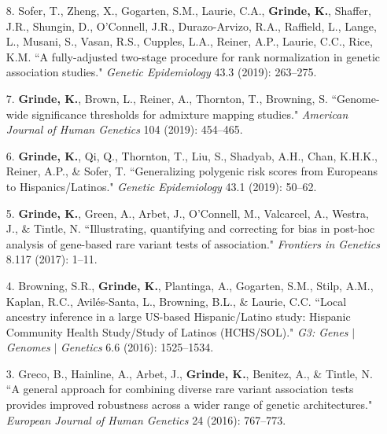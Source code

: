 \documentclass[margin]{res}
\begin{document}
\begin{resume}
\begin{itemize}
\item[8.] Sofer, T., Zheng, X., Gogarten, S.M., Laurie, C.A., \textbf{Grinde, K.}, Shaffer, J.R., Shungin, D., O'Connell, J.R., Durazo-Arvizo, R.A., Raffield, L., Lange, L., Musani, S., Vasan, R.S., Cupples, L.A., Reiner, A.P., Laurie, C.C., Rice, K.M. ``A fully-adjusted two-stage procedure for rank normalization in genetic association studies." \textit{Genetic Epidemiology} 43.3 (2019): 263--275.

\item[7.] \textbf{Grinde, K.}, Brown, L., Reiner, A., Thornton, T., Browning, S. ``Genome-wide significance thresholds for admixture mapping studies." \textit{American Journal of Human Genetics} 104 (2019): 454--465. 

\item[6.] \textbf{Grinde, K.}, Qi, Q., Thornton, T., Liu, S., Shadyab, A.H., Chan, K.H.K., Reiner, A.P., \& Sofer, T. ``Generalizing polygenic risk scores from Europeans to Hispanics/Latinos." \textit{Genetic Epidemiology} 43.1 (2019): 50--62. 
 
\item[5.] \textbf{Grinde, K.}, Green, A., Arbet, J., O'Connell, M., Valcarcel, A., Westra, J., \& Tintle, N. ``Illustrating, quantifying and correcting for bias in post-hoc analysis of gene-based rare variant tests of association." \textit{Frontiers in Genetics} 8.117 (2017): 1--11. 

\item[4.] Browning, S.R., \textbf{Grinde, K.}, Plantinga, A., Gogarten, S.M., Stilp, A.M., Kaplan, R.C., Avil\'es-Santa, L., Browning, B.L., \& Laurie, C.C. ``Local ancestry inference in a large US-based Hispanic/Latino study: Hispanic Community Health Study/Study of Latinos (HCHS/SOL)." \textit{G3: Genes} $|$ \textit{Genomes} $|$ \textit{Genetics} 6.6 (2016): 1525--1534.

\item[3.] Greco, B., Hainline, A., Arbet, J., \textbf{Grinde, K.}, Benitez, A., \& Tintle, N. ``A general approach for combining diverse rare variant association tests provides improved robustness across a wider range of genetic architectures." \textit{European Journal of Human Genetics} 24 (2016): 767--773.


\end{itemize}
\end{resume}
\end{document}
